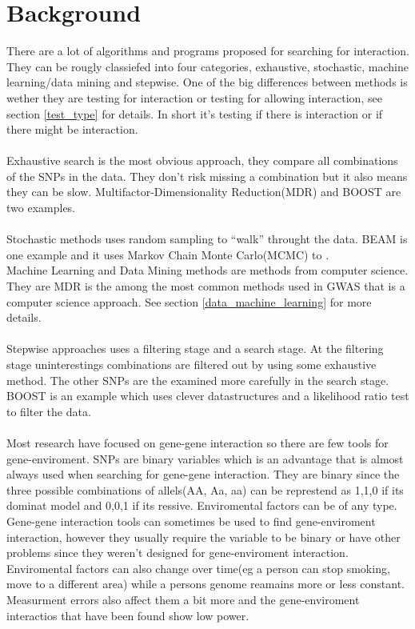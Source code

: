 \documentclass[10pt,a4paper]{article}
\begin{document}
\clearpage
\section{Background}

There are a lot of algorithms and programs proposed for searching for interaction. They can be rougly classiefed into four categories, exhaustive, stochastic, machine learning/data mining and stepwise\cite{fast_high_order_cluster}. One of the big differences between methods is wether they are testing for interaction or testing for allowing interaction, see section \ref{test_type} for details. In short it's testing if there is interaction or if there might be interaction.\\
\\
Exhaustive search is the most obvious approach, they compare all combinations of the SNPs in the data. They don't risk missing a combination but it also means they can be slow. Multifactor-Dimensionality Reduction(MDR)\cite{mdr_2001} and BOOST\cite{boost_gene_gene} are two examples.\\
\\
Stochastic methods uses random sampling to ``walk'' throught the data. BEAM\cite{beam_2007} is one example and it uses Markov Chain Monte Carlo(MCMC) to .
\\
Machine Learning and Data Mining methods are methods from computer science. They are 
MDR\cite{mdr_2001} is the among the most common methods used in GWAS that is a computer science approach. See section \ref{data_machine_learning} for more details.\\
\\
Stepwise approaches uses a filtering stage and a search stage. At the filtering stage uninterestings combinations are filtered out by using some exhaustive method. The other SNPs are the examined more carefully in the search stage. BOOST\cite{boost_gene_gene} is an example which uses clever datastructures and a likelihood ratio test to filter the data.\\
\\
Most research have focused on gene-gene interaction so there are few tools for gene-enviroment. SNPs are binary variables which is an advantage that is almost always used when searching for gene-gene interaction. They are binary since the three possible combinations of allels(AA, Aa, aa)  can be represtend as 1,1,0 if its dominat model and 0,0,1 if its ressive\cite{}. Enviromental factors can be of any type\cite{gene_enviroment_2013}. Gene-gene interaction tools can sometimes be used to find gene-enviroment interaction, however they usually require the variable to be binary or have other problems since they weren't designed for gene-enviroment interaction\cite{gene_enviroment_2013}. Enviromental factors can also change over time(eg a person can stop smoking, move to a different area) while a persons genome reamains more or less constant. Measurment errors also affect them a bit more and the gene-enviroment interactios that have been found show low power\cite{}.\\
\end{document}
